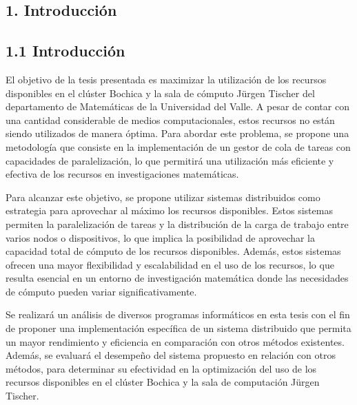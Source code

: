 \begin{doublespace}
\begin{tightcenter}
\section{1. Introducción}
\mylinespacing
\end{tightcenter}

\begin{multicols}{2}

    \subsection{1.1  Introducción}

    El objetivo de la tesis presentada es maximizar la utilización de los recursos disponibles en el clúster Bochica y la sala de cómputo Jürgen Tischer del departamento de Matemáticas de la Universidad del Valle. A pesar de contar con una cantidad considerable de medios computacionales, estos recursos no están siendo utilizados de manera óptima. Para abordar este problema, se propone una metodología que consiste en la implementación de un gestor de cola de tareas con capacidades de paralelización, lo que permitirá una utilización más eficiente y efectiva de los recursos en investigaciones matemáticas.
    \vspace{3mm} 

    Para alcanzar este objetivo, se propone utilizar sistemas distribuidos como estrategia para aprovechar al máximo los recursos disponibles. Estos sistemas permiten la paralelización de tareas y la distribución de la carga de trabajo entre varios nodos o dispositivos, lo que implica la posibilidad de aprovechar la capacidad total de cómputo de los recursos disponibles. Además, estos sistemas ofrecen una mayor flexibilidad y escalabilidad en el uso de los recursos, lo que resulta esencial en un entorno de investigación matemática donde las necesidades de cómputo pueden variar significativamente.
    \vspace{3mm} 

    Se realizará un análisis de diversos programas informáticos en esta tesis con el fin de proponer una implementación específica de un sistema distribuido que permita un mayor rendimiento y eficiencia en comparación con otros métodos existentes. Además, se evaluará el desempeño del sistema propuesto en relación con otros métodos, para determinar su efectividad en la optimización del uso de los recursos disponibles en el clúster Bochica y la sala de computación Jürgen Tischer.
    

\end{multicols}
\end{doublespace}
